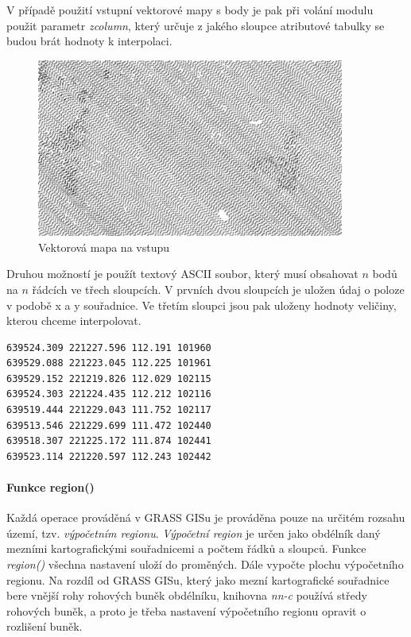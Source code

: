 \documentclass[12pt,a4paper]{article}
\begin{document}
V případě použití vstupní vektorové mapy s body je pak při volání modulu použit parametr \emph{zcolumn}, který určuje z jakého sloupce atributové tabulky se budou brát hodnoty k interpolaci.

\begin{figure}[h!]
\centering
\includegraphics[width=0.9\textwidth]{img/vstup_vect_map.png}
\caption{Vektorová mapa na vstupu}
\label{fig:vstup_vect_map}
\end{figure}

\newpage
Druhou možností je použít textový ASCII soubor, který musí obsahovat $n$ bodů na $n$ řádcích ve třech sloupcích. V prvních dvou sloupcích je uložen údaj o poloze v podobě x a y souřadnice. Ve třetím sloupci jsou pak uloženy hodnoty veličiny, kterou chceme interpolovat.

\begin{lstlisting}[caption={Příklad vstupního souboru}]
639524.309 221227.596 112.191 101960
639529.088 221223.045 112.225 101961
639529.152 221219.826 112.029 102115
639524.303 221224.435 112.212 102116
639519.444 221229.043 111.752 102117
639513.546 221229.699 111.472 102440
639518.307 221225.172 111.874 102441
639523.114 221220.597 112.243 102442
\end{lstlisting}

\bigskip
\paragraph{Funkce region()}
Každá operace prováděná v GRASS GISu je prováděna pouze na určitém rozsahu území, tzv. \emph{výpočetním regionu}. \emph{Výpočetní region} je určen jako obdélník daný mezními kartografickými souřadnicemi a počtem řádků a sloupců. 
Funkce \emph{region()} všechna nastavení uloží do proměných. Dále vypočte plochu výpočetního regionu. Na rozdíl od GRASS GISu, který jako mezní kartografické souřadnice bere vnější rohy rohových buněk obdélníku, knihovna \emph{nn-c} používá středy rohových buněk, a proto je třeba nastavení výpočetního regionu opravit o rozlišení buněk.
\end{document}
